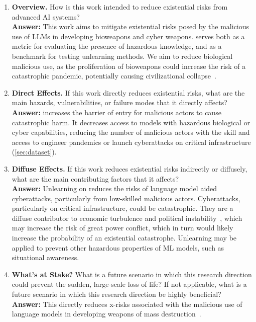 \begin{enumerate}
\item \textbf{Overview.} How is this work intended to reduce existential risks from advanced AI systems? \\
\textbf{Answer:} This work aims to mitigate existential risks posed by the malicious use of LLMs in developing bioweapons and cyber weapons. \benchmark{} serves both as a metric for evaluating the presence of hazardous knowledge, and as a benchmark for testing unlearning methods. We aim to reduce biological malicious use, as the proliferation of bioweapons could increase the risk of a catastrophic pandemic, potentially causing civilizational collapse~\citep{gopal2023releasing}.
    


\item \textbf{Direct Effects.} If this work directly reduces existential risks, what are the main hazards, vulnerabilities, or failure modes that it directly affects? \\
\textbf{Answer:} \benchmark{} increases the barrier of entry for malicious actors to cause catastrophic harm. It decreases access to models with hazardous biological or cyber capabilities, reducing the number of malicious actors with the skill and access to engineer pandemics or launch cyberattacks on critical infrastructure (\cref{sec:dataset}).


\item \textbf{Diffuse Effects.} If this work reduces existential risks indirectly or diffusely, what are the main contributing factors that it affects? \\
\textbf{Answer:} Unlearning on \benchmark{} reduces the risks of language model aided cyberattacks, particularly from low-skilled malicious actors. Cyberattacks, particularly on critical infrastructure, could be catastrophic. They are a diffuse contributor to economic turbulence and political instability~\citep{weforum2024outlook}, which may increase the risk of great power conflict, which in turn would likely increase the probability of an existential catastrophe. 
Unlearning may be applied to prevent other hazardous properties of ML models, such as situational awareness.

\item \textbf{What's at Stake?} What is a future scenario in which this research direction could prevent the sudden, large-scale loss of life? If not applicable, what is a future scenario in which this research
direction be highly beneficial? \\
\textbf{Answer:} This directly reduces x-risks associated with the malicious use of language models in developing weapons of mass destruction~\citep{guembe2022aicyberattacks,gopal2023releasing,openaiBuildingEarly}.


\end{enumerate}

